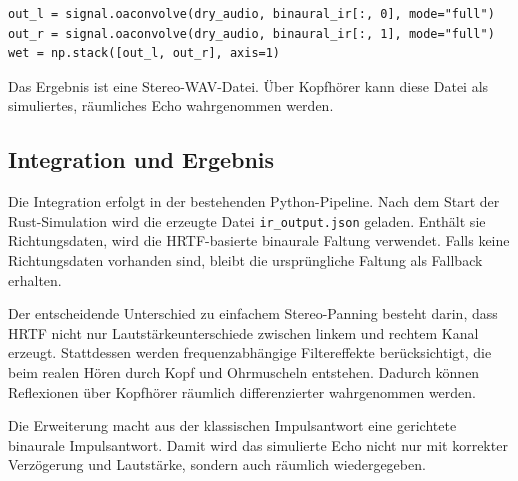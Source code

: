 \begin{lstlisting}
out_l = signal.oaconvolve(dry_audio, binaural_ir[:, 0], mode="full")
out_r = signal.oaconvolve(dry_audio, binaural_ir[:, 1], mode="full")
wet = np.stack([out_l, out_r], axis=1)
\end{lstlisting}

Das Ergebnis ist eine Stereo-WAV-Datei. Über Kopfhörer kann diese Datei als simuliertes, räumliches Echo wahrgenommen werden.

\subsection{Integration und Ergebnis}
\label{subsec:hrtf_integration_result}

Die Integration erfolgt in der bestehenden Python-Pipeline. Nach dem Start der Rust-Simulation wird die erzeugte Datei \texttt{ir\_output.json} geladen. Enthält sie Richtungsdaten, wird die HRTF-basierte binaurale Faltung verwendet. Falls keine Richtungsdaten vorhanden sind, bleibt die ursprüngliche Faltung als Fallback erhalten.

Der entscheidende Unterschied zu einfachem Stereo-Panning besteht darin, dass HRTF nicht nur Lautstärkeunterschiede zwischen linkem und rechtem Kanal erzeugt. Stattdessen werden frequenzabhängige Filtereffekte berücksichtigt, die beim realen Hören durch Kopf und Ohrmuscheln entstehen. Dadurch können Reflexionen über Kopfhörer räumlich differenzierter wahrgenommen werden.

Die Erweiterung macht aus der klassischen Impulsantwort eine gerichtete binaurale Impulsantwort. Damit wird das simulierte Echo nicht nur mit korrekter Verzögerung und Lautstärke, sondern auch räumlich wiedergegeben.